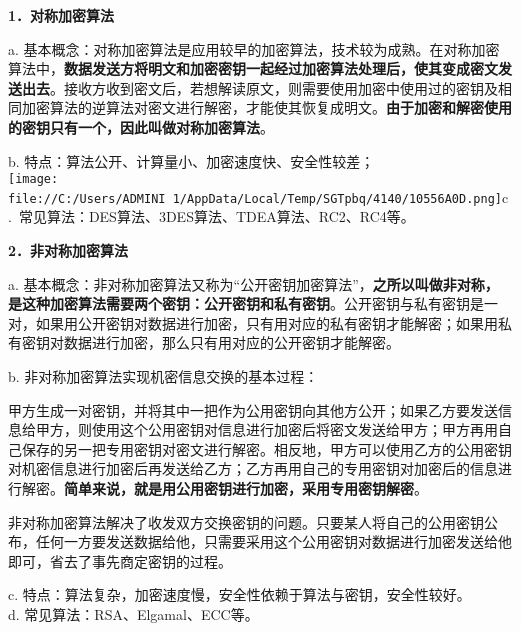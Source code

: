 \textbf{{1．对称加密算法}}

{a.
基本概念：对称加密算法是应用较早的加密算法，技术较为成熟。在对称加密算法中，}\textbf{数据发送方将明文和加密密钥一起经过加密算法处理后，使其变成密文发送出去}{。接收方收到密文后，若想解读原文，则需要使用加密中使用过的密钥及相同加密算法的逆算法对密文进行解密，才能使其恢复成明文。}\textbf{{由于加密和解密使用的密钥只有一个，因此叫做对称加密算法}}{。}

b. 特点：算法公开、计算量小、加密速度快、安全性较差；\\

\texttt{[image: file://C:/Users/ADMINI~1/AppData/Local/Temp/SGTpbq/4140/10556A0D.png]}c.~常见算法：DES算法、3DES算法、TDEA算法、RC2、RC4等。

\textbf{{2．非对称加密算法}}

a.
基本概念：非对称加密算法又称为``公开密钥加密算法''，\textbf{之所以叫做非对称，是这种加密算法需要两个密钥：公开密钥和私有密钥}。公开密钥与私有密钥是一对，如果用公开密钥对数据进行加密，只有用对应的私有密钥才能解密；如果用私有密钥对数据进行加密，那么只有用对应的公开密钥才能解密。

{b. 非对称加密算法实现机密信息交换的基本过程：}

甲方生成一对密钥，并将其中一把作为公用密钥向其他方公开；如果乙方要发送信息给甲方，则使用这个公用密钥对信息进行加密后将密文发送给甲方；甲方再用自己保存的另一把专用密钥对密文进行解密。相反地，甲方可以使用乙方的公用密钥对机密信息进行加密后再发送给乙方；乙方再用自己的专用密钥对加密后的信息进行解密。\textbf{{简单来说，就是用公用密钥进行加密，采用专用密钥解密}}。

非对称加密算法解决了收发双方交换密钥的问题。只要某人将自己的公用密钥公布，任何一方要发送数据给他，只需要采用这个公用密钥对数据进行加密发送给他即可，省去了事先商定密钥的过程。

c. 特点：算法复杂，加密速度慢，安全性依赖于算法与密钥，安全性较好。\\

d. 常见算法：RSA、Elgamal、ECC等。
